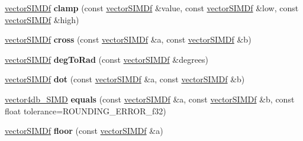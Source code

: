 \begin{DoxyCompactItemize}
\item 
\hyperlink{classirr_1_1core_1_1vectorSIMDf}{vector\+S\+I\+M\+Df} {\bfseries clamp} (const \hyperlink{classirr_1_1core_1_1vectorSIMDf}{vector\+S\+I\+M\+Df} \&value, const \hyperlink{classirr_1_1core_1_1vectorSIMDf}{vector\+S\+I\+M\+Df} \&low, const \hyperlink{classirr_1_1core_1_1vectorSIMDf}{vector\+S\+I\+M\+Df} \&high)\hypertarget{namespaceirr_1_1core_ab90e4fd8cbde185d745c532d89e5cb57}{}\label{namespaceirr_1_1core_ab90e4fd8cbde185d745c532d89e5cb57}

\item 
\hyperlink{classirr_1_1core_1_1vectorSIMDf}{vector\+S\+I\+M\+Df} {\bfseries cross} (const \hyperlink{classirr_1_1core_1_1vectorSIMDf}{vector\+S\+I\+M\+Df} \&a, const \hyperlink{classirr_1_1core_1_1vectorSIMDf}{vector\+S\+I\+M\+Df} \&b)\hypertarget{namespaceirr_1_1core_a2dccda49cf02e3126b28d4d5e439fd41}{}\label{namespaceirr_1_1core_a2dccda49cf02e3126b28d4d5e439fd41}

\item 
\hyperlink{classirr_1_1core_1_1vectorSIMDf}{vector\+S\+I\+M\+Df} {\bfseries deg\+To\+Rad} (const \hyperlink{classirr_1_1core_1_1vectorSIMDf}{vector\+S\+I\+M\+Df} \&degrees)\hypertarget{namespaceirr_1_1core_ad5fa1a9dfc2bb97bd5b8d85326691140}{}\label{namespaceirr_1_1core_ad5fa1a9dfc2bb97bd5b8d85326691140}

\item 
\hyperlink{classirr_1_1core_1_1vectorSIMDf}{vector\+S\+I\+M\+Df} {\bfseries dot} (const \hyperlink{classirr_1_1core_1_1vectorSIMDf}{vector\+S\+I\+M\+Df} \&a, const \hyperlink{classirr_1_1core_1_1vectorSIMDf}{vector\+S\+I\+M\+Df} \&b)\hypertarget{namespaceirr_1_1core_a9557f4973836d83bd378577bdaa88488}{}\label{namespaceirr_1_1core_a9557f4973836d83bd378577bdaa88488}

\item 
\hyperlink{classirr_1_1core_1_1vectorSIMDBool}{vector4db\+\_\+\+S\+I\+MD} {\bfseries equals} (const \hyperlink{classirr_1_1core_1_1vectorSIMDf}{vector\+S\+I\+M\+Df} \&a, const \hyperlink{classirr_1_1core_1_1vectorSIMDf}{vector\+S\+I\+M\+Df} \&b, const float tolerance=R\+O\+U\+N\+D\+I\+N\+G\+\_\+\+E\+R\+R\+O\+R\+\_\+f32)\hypertarget{namespaceirr_1_1core_a0917a734ca0da736b409752ebfd7bdcb}{}\label{namespaceirr_1_1core_a0917a734ca0da736b409752ebfd7bdcb}

\item 
\hyperlink{classirr_1_1core_1_1vectorSIMDf}{vector\+S\+I\+M\+Df} {\bfseries floor} (const \hyperlink{classirr_1_1core_1_1vectorSIMDf}{vector\+S\+I\+M\+Df} \&a)\hypertarget{namespaceirr_1_1core_acb754dc432e80f8cac8da8ad99201b7e}{}\label{namespaceirr_1_1core_acb754dc432e80f8cac8da8ad99201b7e}


\end{DoxyCompactItemize}
